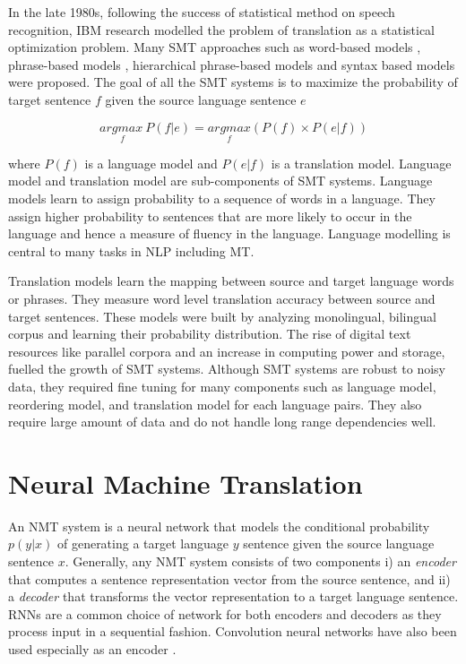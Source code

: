 
In the late 1980s, following the success of statistical method on speech recognition, IBM research \citep{brown1993mathematics} modelled the problem of translation as a statistical optimization problem. Many SMT approaches such as word-based models \citep{brown1993mathematics}, phrase-based models \citep{koehn2003statistical,marcu2002phrase}, hierarchical phrase-based  models \citep{chiang2007hierarchical} and syntax based models \cite{galley2004s,galley2006scalable} were proposed. The goal of all the SMT systems is to maximize the probability of target sentence $f$ given the source language sentence $e$

\begin{equation}
\underset{f}{argmax \  } P(f|e) = \underset{f}{arg max } (P(f) \times P(e|f)) 
\end{equation}


where $P(f)$ is a language model and $P(e|f)$ is a translation model. Language model and translation model are sub-components of SMT systems. Language models learn to assign probability to a sequence of words in a language. They assign higher probability to sentences that are more likely to occur in the language and hence a measure of fluency in the language. Language modelling is central to many tasks in NLP including MT.  

Translation models learn the mapping between source and target language words or phrases. They measure word level translation accuracy between source and target sentences. These models were built by analyzing  monolingual, bilingual corpus and learning their probability distribution. The rise of digital text resources like parallel corpora and an increase in computing power and storage, fuelled the growth of SMT systems. Although SMT systems are robust to noisy data,  they required fine tuning for many components such as language model, reordering model, and translation model for each language pairs. They also require large amount of data and do not handle long range dependencies well.


\section{Neural Machine Translation}

An NMT system is a neural network that models the conditional probability $p(y|x)$ of generating a target language $y$ sentence given the source language sentence $x$. Generally, any NMT system consists of two components i) an \textit{encoder} that computes a sentence representation vector from the source sentence, and ii) a \textit{decoder} that transforms the vector representation to a target language sentence. RNNs are a common choice of network for both encoders and decoders as they process input in a sequential fashion. Convolution neural networks have also been used especially as an encoder \citep{kalchbrenner2013recurrent}.

